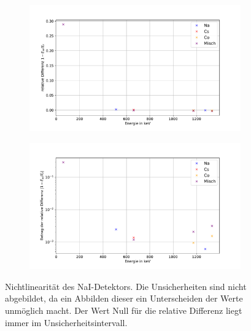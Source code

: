 \documentclass[
	a4paper,
	12pt,
	pagesize,
	ngerman
]{scrartcl}
\begin{document}
\begin{figure}[H]
		\centering
		\begin{subfigure}[t]{0.8\textwidth}
			\centering
			\includegraphics[width= \linewidth]{img/diff_na.pdf}
		\end{subfigure}
		\begin{subfigure}[t]{0.8\textwidth}
			\centering
			\includegraphics[width=\linewidth]{img/diff_na_log.pdf}
		\end{subfigure}
		\caption{Nichtlinearität des NaI-Detektors.
		Die Unsicherheiten sind nicht abgebildet, da ein Abbilden dieser ein Unterscheiden der Werte unmöglich macht. %
		Der Wert Null für die relative Differenz liegt immer im Unsicherheitsintervall.
		}
		\label{fg_diff_na}
	\end{figure}
\end{document}
